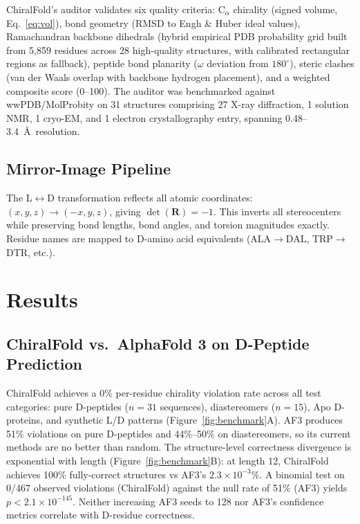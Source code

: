 \documentclass[11pt]{article}
\begin{document}
ChiralFold's auditor validates six quality criteria: C$_\alpha$ chirality
(signed volume, Eq.~\ref{eq:vol}), bond geometry (RMSD to Engh \& Huber
ideal values), Ramachandran backbone dihedrals (hybrid empirical PDB
probability grid built from 5,859 residues across 28 high-quality
structures, with calibrated rectangular regions as fallback), peptide bond
planarity ($\omega$ deviation from $180^\circ$), steric clashes
(van der Waals overlap with backbone hydrogen placement), and a weighted
composite score (0--100). The auditor was benchmarked against wwPDB/MolProbity
on 31 structures comprising 27 X-ray diffraction, 1 solution NMR, 1 cryo-EM,
and 1 electron crystallography entry, spanning 0.48--3.4~\AA\ resolution.

\subsection{Mirror-Image Pipeline}

The L$\leftrightarrow$D transformation reflects all atomic coordinates:
$(x, y, z) \to (-x, y, z)$, giving $\det(\mathbf{R}) = -1$. This inverts
all stereocenters while preserving bond lengths, bond angles, and torsion
magnitudes exactly. Residue names are mapped to D-amino acid equivalents
(ALA$\to$DAL, TRP$\to$DTR, etc.).

\section{Results}

\subsection{ChiralFold vs.\ AlphaFold 3 on D-Peptide Prediction}

ChiralFold achieves a 0\% per-residue chirality violation rate across all
test categories: pure D-peptides ($n = 31$ sequences), diastereomers
($n = 15$), Apo D-proteins, and synthetic L/D patterns
(Figure~\ref{fig:benchmark}A). AF3 produces 51\% violations on pure
D-peptides and 44\%--50\% on diastereomers, so its current methods are no better than random. The
structure-level correctness divergence is exponential with length
(Figure~\ref{fig:benchmark}B): at length 12, ChiralFold achieves 100\%
fully-correct structures vs AF3's $2.3 \times 10^{-3}$\%. A binomial test
on 0/467 observed violations (ChiralFold) against the null rate of 51\%
(AF3) yields $p < 2.1 \times 10^{-145}$. Neither increasing AF3 seeds to
128 nor AF3's confidence metrics correlate with D-residue correctness.
\end{document}
